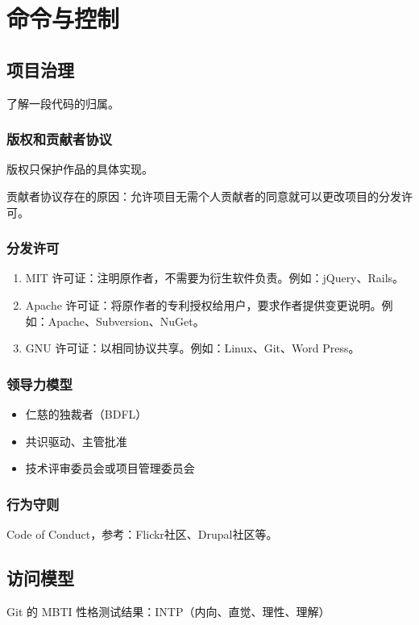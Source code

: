 \documentclass[cn,pad,11pt,green,geye]{../elegantnote}
\begin{document}
\section{命令与控制}

\subsection{项目治理}
了解一段代码的归属。

\subsubsection{版权和贡献者协议}
版权只保护作品的具体实现。

贡献者协议存在的原因：允许项目无需个人贡献者的同意就可以更改项目的分发许可。

\subsubsection{分发许可}

\begin{enumerate}
   \item MIT 许可证：注明原作者，不需要为衍生软件负责。例如：jQuery、Rails。
   \item Apache 许可证：将原作者的专利授权给用户，要求作者提供变更说明。例如：Apache、Subversion、NuGet。
   \item GNU 许可证：以相同协议共享。例如：Linux、Git、Word Press。
\end{enumerate}

\subsubsection{领导力模型}
\begin{itemize}
   \item 仁慈的独裁者（BDFL）
   \item 共识驱动、主管批准
   \item 技术评审委员会或项目管理委员会
\end{itemize}

\subsubsection{行为守则}
Code of Conduct，参考：Flickr社区、Drupal社区等。

\subsection{访问模型}
Git 的 MBTI 性格测试结果：INTP（内向、直觉、理性、理解）
\end{document}
